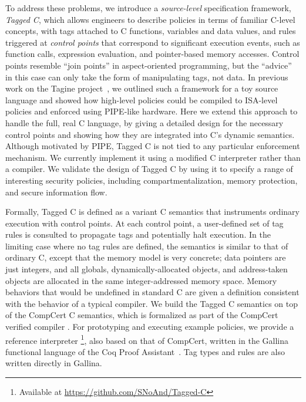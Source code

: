 To address these problems, we introduce a \emph{source-level} specification framework, \emph{Tagged C},
which allows engineers to describe policies in terms of familiar C-level concepts, with tags attached
to C functions, variables and data values, and rules triggered at \emph{control points} that
correspond to significant execution events, such as function calls, expression evaluation,
and pointer-based memory accesses. 
Control points resemble ``join points'' in aspect-oriented programming, but the ``advice''
in this case can only take the form of manipulating tags, not data.
In previous work on the Tagine project~\cite{Chhak21:Tagine}, we outlined such a framework for a toy
source language and showed how high-level policies could be compiled to ISA-level policies and 
enforced using PIPE-like hardware.  Here we extend this approach to handle
the full, real C language, by giving a detailed design for the necessary control points and
showing how they are integrated into C's dynamic semantics. 
Although motivated by PIPE, Tagged C is not tied to any particular enforcement mechanism. 
We currently implement it using a modified C interpreter rather than a compiler.
We validate the design of Tagged C by using it to specify a range of interesting security policies,
including compartmentalization, memory protection, and secure information flow.


Formally, Tagged C is defined as a variant C semantics that instruments ordinary execution with
control points. At each control point, a user-defined set of tag rules is consulted to propagate
tags and potentially halt execution. In the limiting case where no tag rules are
defined, the semantics is similar to
that of ordinary C, except that the memory model is very concrete; 
data pointers are just integers, and all globals, dynamically-allocated objects,
and address-taken objects are allocated in the same integer-addressed memory space. Memory behaviors
that would be undefined in standard C are given a definition %
consistent with the behavior of a typical compiler.
We build the Tagged C semantics on top of the CompCert C semantics, which is formalized 
as part of the CompCert verified compiler \cite{Leroy09:CompCert,Leroy09:CompCertBackend}.
For prototyping and executing example policies,
we provide a reference interpreter \footnote{Available at \url{https://github.com/SNoAnd/Tagged-C}},
also based on that of CompCert,
written in the Gallina functional language of the Coq Proof Assistant~\cite{coq}.
Tag types and rules are also written directly in Gallina. 

